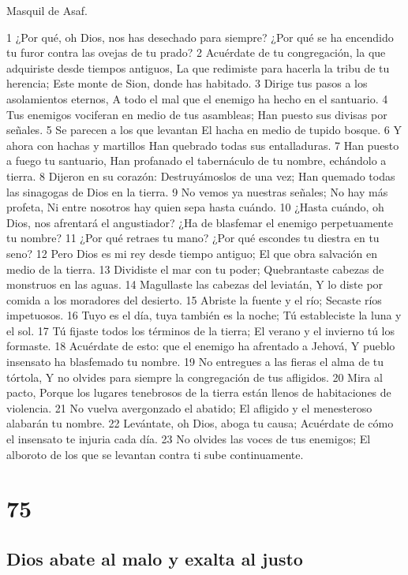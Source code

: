 Masquil de Asaf.

1 ¿Por qué, oh Dios, nos has desechado para siempre?
¿Por qué se ha encendido tu furor contra las ovejas de tu prado?
2 Acuérdate de tu congregación, la que adquiriste desde tiempos antiguos,
La que redimiste para hacerla la tribu de tu herencia;
Este monte de Sion, donde has habitado.
3 Dirige tus pasos a los asolamientos eternos,
A todo el mal que el enemigo ha hecho en el santuario.
4 Tus enemigos vociferan en medio de tus asambleas;
Han puesto sus divisas por señales.
5 Se parecen a los que levantan
El hacha en medio de tupido bosque.
6 Y ahora con hachas y martillos
Han quebrado todas sus entalladuras.
7 Han puesto a fuego tu santuario,
Han profanado el tabernáculo de tu nombre, echándolo a tierra.
8 Dijeron en su corazón: Destruyámoslos de una vez;
Han quemado todas las sinagogas de Dios en la tierra.
9 No vemos ya nuestras señales;
No hay más profeta,
Ni entre nosotros hay quien sepa hasta cuándo.
10 ¿Hasta cuándo, oh Dios, nos afrentará el angustiador?
¿Ha de blasfemar el enemigo perpetuamente tu nombre?
11 ¿Por qué retraes tu mano?
¿Por qué escondes tu diestra en tu seno?
12 Pero Dios es mi rey desde tiempo antiguo;
El que obra salvación en medio de la tierra.
13 Dividiste el mar con tu poder;
Quebrantaste cabezas de monstruos en las aguas.
14 Magullaste las cabezas del leviatán,
Y lo diste por comida a los moradores del desierto.
15 Abriste la fuente y el río;
Secaste ríos impetuosos.
16 Tuyo es el día, tuya también es la noche;
Tú estableciste la luna y el sol.
17 Tú fijaste todos los términos de la tierra;
El verano y el invierno tú los formaste.
18 Acuérdate de esto: que el enemigo ha afrentado a Jehová,
Y pueblo insensato ha blasfemado tu nombre.
19 No entregues a las fieras el alma de tu tórtola,
Y no olvides para siempre la congregación de tus afligidos.
20 Mira al pacto,
Porque los lugares tenebrosos de la tierra están llenos de habitaciones de violencia.
21 No vuelva avergonzado el abatido;
El afligido y el menesteroso alabarán tu nombre.
22 Levántate, oh Dios, aboga tu causa;
Acuérdate de cómo el insensato te injuria cada día.
23 No olvides las voces de tus enemigos;
El alboroto de los que se levantan contra ti sube continuamente.

\chapter{75}

\section*{Dios abate al malo y exalta al justo}

